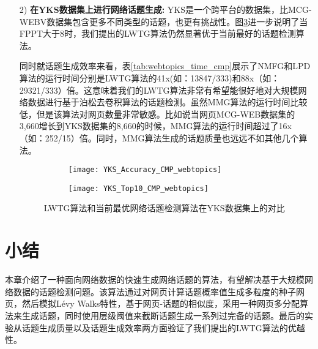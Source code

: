 \begin{enumerate}
  \item[2)] \textbf{在YKS数据集上进行网络话题生成:} YKS是一个跨平台的数据集，比MCG-WEBV数据集包含更多不同类型的话题，也更有挑战性。图\ref{fig:YKS_CMP_webtopics}进一步说明了当FPPT大于8时，我们提出的LWTG算法仍然显著优于当前最好的话题检测算法。

  同时就话题生成效率来看，表\ref{tab:webtopics_time_cmp}展示了NMFG和LPD算法的运行时间分别是LWTG算法的41x(如：13847/333)和88x（如：29321/333）倍。这意味着我们的LWTG算法非常有希望能很好地对大规模网络数据进行基于泊松去卷积算法的话题检测。虽然MMG算法的运行时间比较低，但是该算法对网页数量非常敏感。比如说当网页MCG-WEB数据集的3,660增长到YKS数据集的8,660的时候，MMG算法的运行时间超过了16x（如：252/15）倍。同时，MMG算法生成的话题质量也远远不如其他几个算法。

  \begin{figure}[!htbp]
    \centering
    \begin{subfigure}[b]{0.5\textwidth}
      \texttt{[image: YKS\_Accuracy\_CMP\_webtopics]}
      \caption{}
      \label{fig:YKS_Accuracy_CMP_webtopics}
    \end{subfigure}%
    \begin{subfigure}[b]{0.5\textwidth}
      \texttt{[image: YKS\_Top10\_CMP\_webtopics]}
      \caption{}
      \label{fig:YKS_Top10_CMP_webtopics}
    \end{subfigure}
    \caption{LWTG算法和当前最优网络话题检测算法在YKS数据集上的对比}
    \label{fig:YKS_CMP_webtopics}
  \end{figure}
\end{enumerate}


\section{小结}

本章介绍了一种面向网络数据的快速生成网络话题的算法，有望解决基于大规模网络数据的话题检测问题。该算法通过对网页计算话题概率值生成多粒度的种子网页，然后模拟L\'evy Walks特性，基于网页-话题的相似度，采用一种网页多分配算法来生成话题，同时使用层级阈值来截断话题生成一系列过完备的话题。最后的实验从话题生成质量以及话题生成效率两方面验证了我们提出的LWTG算法的优越性。

